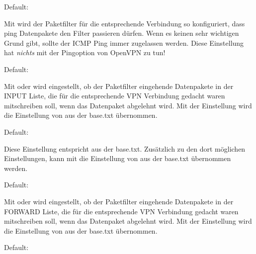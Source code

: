 \begin{description}

  Default: 

  Mit  wird der Paketfilter für die entsprechende
  Verbindung so konfiguriert, dass ping Datenpakete den Filter
  passieren dürfen. Wenn es keinen sehr wichtigen Grund gibt, sollte
  der ICMP Ping immer zugelassen werden. Diese Einstellung hat
  \emph{nichts} mit der Pingoption von OpenVPN zu tun!


  Default: 

  Mit  oder  wird eingestellt, ob der Paketfilter
  eingehende Datenpakete in der INPUT Liste, die für die entsprechende
  VPN Verbindung gedacht waren mitschreiben soll, wenn das Datenpaket
  abgelehnt wird. Mit der Einstellung  wird die
  Einstellung von  aus der base.txt übernommen.


  Default: 

  Diese Einstellung entspricht 
  aus der base.txt. Zusätzlich zu den dort möglichen Einstellungen,
  kann mit  die Einstellung von  aus
  der base.txt übernommen werden.


  Default: 

  Mit  oder  wird eingestellt, ob der Paketfilter
  eingehende Datenpakete in der FORWARD Liste, die für die
  entsprechende VPN Verbindung gedacht waren mitschreiben soll, wenn
  das Datenpaket abgelehnt wird. Mit der Einstellung  wird
  die Einstellung von  aus der base.txt
  übernommen.


  Default: 


\end{description}
